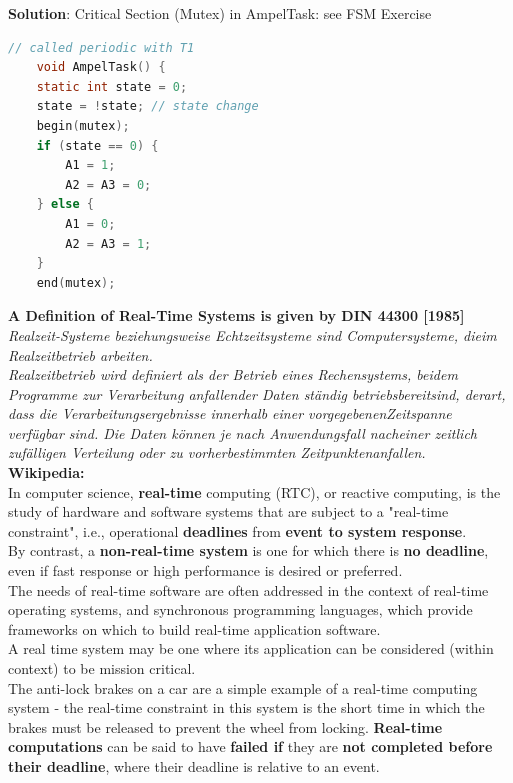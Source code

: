 \newpage
\textbf{Solution}: Critical Section (Mutex) in AmpelTask:  see FSM Exercise

\begin{lstlisting}[style=mystyle, language=c]
 	// called periodic with T1  
	void AmpelTask() {
	static int state = 0;
	state = !state; // state change
  	begin(mutex);
	if (state == 0) {
		A1 = 1;
		A2 = A3 = 0;
	} else {
		A1 = 0;
		A2 = A3 = 1;
	}
  	end(mutex);
\end{lstlisting}

\newpage

{\rot\bf A Definition of Real-Time Systems is given by DIN 44300 [1985]}\\

\textit{ Realzeit-Systeme beziehungsweise Echtzeitsysteme sind Computersysteme, dieim Realzeitbetrieb arbeiten.}\\

\textit{Realzeitbetrieb wird definiert als der Betrieb eines Rechensystems, beidem Programme zur Verarbeitung anfallender Daten st\"{a}ndig betriebsbereitsind, derart, dass die Verarbeitungsergebnisse innerhalb einer vorgegebenenZeitspanne verf\"{u}gbar sind. Die Daten k\"{o}nnen je nach Anwendungsfall nacheiner zeitlich zuf\"{a}lligen Verteilung oder zu vorherbestimmten Zeitpunktenanfallen.}\\

{\rot\bf Wikipedia:}\\

In computer science, \textbf{real-time} computing (RTC), or reactive computing, is the study of hardware and software systems that are subject to a "real-time constraint", i.e., operational \textbf{deadlines} from \textbf{event to system response}. \\

By contrast, a \textbf{non-real-time system}  is one for which there is \textbf{no deadline}, even if fast response or high performance is desired or preferred. \\

The needs of real-time software are often addressed in the context of real-time operating systems, and synchronous programming languages, which provide frameworks on which to build real-time application software.\\

A real time system may be one where its application can be considered (within context) to be mission critical. \\

The anti-lock brakes on a car are a simple example of a real-time computing system - the real-time constraint in this system is the short time in which the brakes must be released to prevent the wheel from locking. \textbf{Real-time computations} can be said to have \textbf{failed if} they are \textbf{not completed before their deadline}, where their deadline is relative to an event. \\

